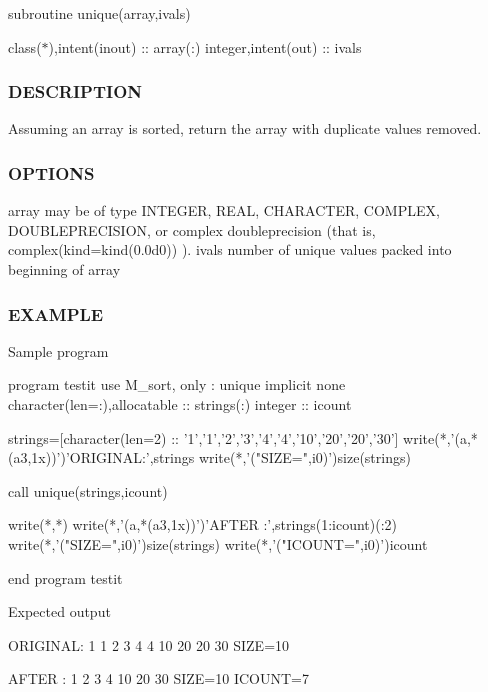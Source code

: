subroutine unique(array,ivals)

class($\ast$),intent(inout) \+:\+: array(\+:) integer,intent(out) \+:\+: ivals

\subsubsection*{D\+E\+S\+C\+R\+I\+P\+T\+I\+ON}

Assuming an array is sorted, return the array with duplicate values removed.

\subsubsection*{O\+P\+T\+I\+O\+NS}

array may be of type I\+N\+T\+E\+G\+ER, R\+E\+AL, C\+H\+A\+R\+A\+C\+T\+ER, C\+O\+M\+P\+L\+EX, D\+O\+U\+B\+L\+E\+P\+R\+E\+C\+I\+S\+I\+ON, or complex doubleprecision (that is, complex(kind=kind(0.\+0d0)) ). ivals number of unique values packed into beginning of array \subsubsection*{E\+X\+A\+M\+P\+LE}

\begin{DoxyVerb}Sample program

 program testit
 use M_sort, only : unique
 implicit none
 character(len=:),allocatable :: strings(:)
 integer                      :: icount

 strings=[character(len=2) :: '1','1','2','3','4','4','10','20','20','30']
 write(*,'(a,*(a3,1x))')'ORIGINAL:',strings
 write(*,'("SIZE=",i0)')size(strings)

 call unique(strings,icount)

 write(*,*)
 write(*,'(a,*(a3,1x))')'AFTER   :',strings(1:icount)(:2)
 write(*,'("SIZE=",i0)')size(strings)
 write(*,'("ICOUNT=",i0)')icount

 end program testit

Expected output

 ORIGINAL: 1   1   2   3   4   4   10  20  20  30
 SIZE=10

 AFTER   : 1   2   3   4   10  20  30
 SIZE=10
 ICOUNT=7 \end{DoxyVerb}
 \mbox{\label{interfacem__sort_1_1unique_a59f7d209491f9b26f8cfb2ff55a93511}} 
